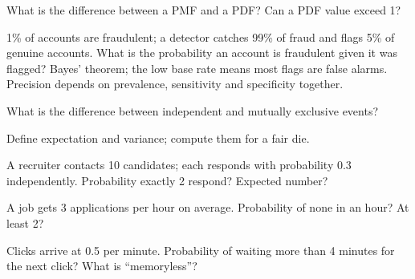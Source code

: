 \begin{qa}{What is the difference between a PMF and a PDF? Can a PDF value exceed 1?}
\end{qa}

\begin{qa}{1\% of accounts are fraudulent; a detector catches 99\% of fraud and flags 5\% of genuine accounts. What is the probability an account is fraudulent given it was flagged?}
\why Bayes' theorem; the low base rate means most flags are false alarms. Precision depends on prevalence, sensitivity and specificity together.
\end{qa}

\begin{qa}{What is the difference between independent and mutually exclusive events?}
\end{qa}

\begin{qa}{Define expectation and variance; compute them for a fair die.}
\end{qa}

\begin{qa}{A recruiter contacts 10 candidates; each responds with probability 0.3 independently. Probability exactly 2 respond? Expected number?}
\end{qa}

\begin{qa}{A job gets 3 applications per hour on average. Probability of none in an hour? At least 2?}
\end{qa}

\begin{qa}{Clicks arrive at 0.5 per minute. Probability of waiting more than 4 minutes for the next click? What is ``memoryless''?}
\end{qa}

